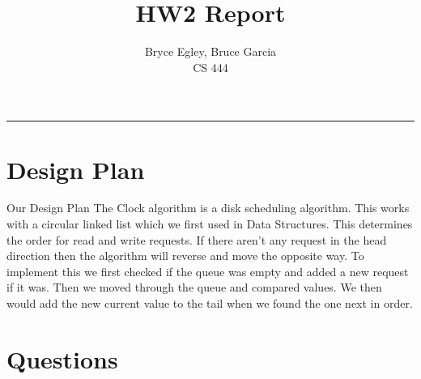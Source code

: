 \documentclass{article}
\begin{document}

\title{HW2 Report} %
\author{Bryce Egley, Bruce Garcia\\CS 444} %

\maketitle
\hrule


%
%

\section*{Design Plan}
Our Design Plan
\newline
The Clock algorithm is a disk scheduling algorithm. This works with a circular linked list which we first used in Data Structures. This determines the order for read and write requests. If there aren’t any request in the head direction then the algorithm will reverse and move the opposite way. To implement this we first checked if the queue was empty and added a new request if it was. Then we moved through the queue and compared values. We then would add the new current value to the tail when we found the one next in order.

\section*{Questions}
\end{document}
